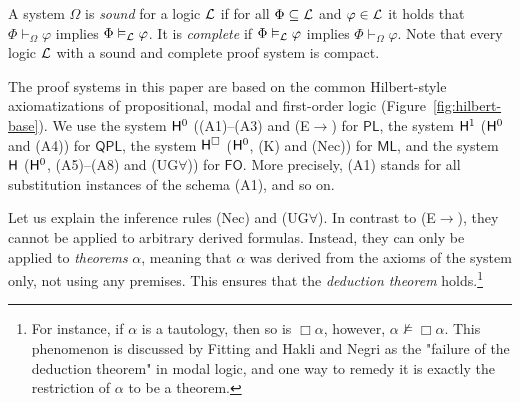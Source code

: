\documentclass[a4paper,english,fleqn,11pt,final]{scrartcl}
\newcommand{\logic}[1]{\ensuremath{\mathsf{#1}}\xspace}
\newcommand{\PL}{\logic{PL}}
\newcommand{\QPL}{\logic{QPL}}
\newcommand{\ML}{\logic{ML}}
\newcommand{\FO}{\logic{FO}}
\newcommand{\calL}{\protect\ensuremath{\mathcal{L}}}
\newcommand{\sfH}{\protect\ensuremath{\mathsf{H}}}
\newcommand{\imp}{\rightarrow}
\newcommand{\Deriv}[1]{{\normalfont\textsf{#1}}}
\theoremstyle{plain}
\theoremstyle{definition}
\begin{document}
A system $\Omega$ is \emph{sound} for a logic $\calL$ if for all $\Phi \subseteq \calL$ and $\varphi \in \calL$ it holds that $\Phi \vdash_\Omega \varphi$ implies $\Phi \vDash_\calL \varphi$.
It is \emph{complete} if $\Phi \vDash_\calL \varphi$ implies $\Phi \vdash_\Omega \varphi$.
Note that every logic $\calL$ with a sound and complete proof system is compact.

\medskip

The proof systems in this paper are based on the common Hilbert-style axiomatizations of propositional, modal and first-order logic (Figure~\ref{fig:hilbert-base}).
We use the system $\sfH^0$ (\Deriv{(A1)}--\Deriv{(A3)} and \Deriv{(E$\imp$)} for $\PL$, the system $\sfH^1$ ($\sfH^0$ and \Deriv{(A4)}) for $\QPL$, the system $\sfH^\Box$ ($\sfH^0$, \Deriv{(K)} and \Deriv{(Nec)}) for $\ML$, and the system $\sfH$ ($\sfH^0$, \Deriv{(A5)}--\Deriv{(A8}) and \Deriv{(UG$\forall$)}) for $\FO$.
More precisely, \Deriv{(A1)} stands for all substitution instances of the schema \Deriv{(A1)}, and so on.

Let us explain the inference rules \Deriv{(Nec)} and \Deriv{(UG$\forall$)}.
In contrast to \Deriv{(E$\imp$)}, they cannot be applied to arbitrary derived formulas.
Instead, they can only be applied to \emph{theorems} $\alpha$, meaning that $\alpha$ was derived from the axioms of the system only, not using any premises.
This ensures that the \emph{deduction theorem} holds.\footnote{For instance, if $\alpha$ is a tautology, then so is $\Box\alpha$, however, $\alpha \nvDash \Box\alpha$.
This phenomenon is discussed by Fitting and Hakli and Negri \cite{deduction_fail,patrick_blackburn_2_2007} as the "failure of the deduction theorem" in modal logic, and one way to remedy it is exactly the restriction of $\alpha$ to be a theorem.}
\end{document}
